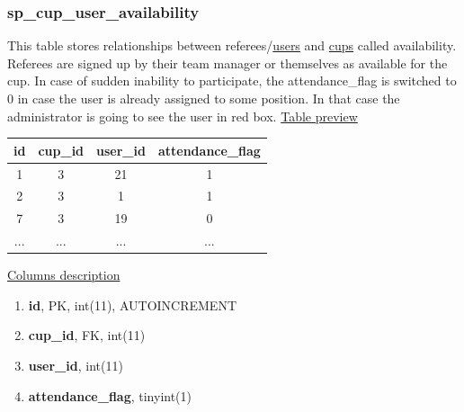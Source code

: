 \subsubsection*{sp\_cup\_user\_availability}
This table stores relationships between referees/\underline{users} and \underline{cups} called availability. Referees are signed up by their team manager or themselves as available for the cup. In case of sudden inability to participate, the attendance\_flag is switched to 0 in case the user is already assigned to some position. In that case the administrator is going to see the user in red box.
\newline
\underline{Table preview}
\begin{center}
 \begin{tabular}{||c c c c||} 
 \hline
 id & cup\_id & user\_id & attendance\_flag  \\ [0.5ex] 
 \hline\hline
 1 & 3 & 21 & 1 \\ 
 \hline
 2 & 3 & 1 & 1 \\ 
 \hline
 7 & 3 & 19 & 0 \\ 
 \hline
 ... & ... & ... & ...  \\ [0.5ex] 
 \hline
\end{tabular}
\end{center}
\underline{Columns description}
\begin{enumerate}
  \setlength\itemsep{0em}
  \item \textbf{id}, PK, int(11), AUTOINCREMENT
  \item \textbf{cup\_id}, FK, int(11)
  \item \textbf{user\_id}, int(11)
  \item \textbf{attendance\_flag}, tinyint(1)
\end{enumerate}

